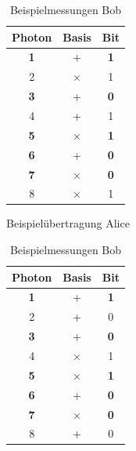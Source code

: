 \begin{table}[ht]
    \centering
    \setlength\tabcolsep{4pt}
    \begin{minipage}{.45\textwidth}
        \centering
        \begin{tabular}{|c|c|c|}
        \hline
        Photon      & Basis     & Bit           \\ \hline
        \textbf{1}  & +         & \textbf{1}    \\ \hline
        2           & $\times$  & 1             \\ \hline 
        \textbf{3}  & +         & \textbf{0}    \\ \hline
        4           & +         & 1             \\ \hline
        \textbf{5}  & $\times$  & \textbf{1}    \\ \hline
        \textbf{6}  & +         & \textbf{0}    \\ \hline
        \textbf{7}  & $\times$  & \textbf{0}    \\ \hline
        8           & $\times$  & 1             \\ \hline
        \end{tabular}
        \caption{Beispielübertragung Alice}
    \end{minipage}%
    \hfill
    \begin{minipage}{.45\textwidth}
        \centering
        \begin{tabular}{|c|c|c|}
        \hline
        Photon      & Basis     & Bit           \\ \hline
        \textbf{1}  & +         & \textbf{1}    \\ \hline
        2           & +         & 0             \\ \hline 
        \textbf{3}  & +         & \textbf{0}    \\ \hline
        4           & $\times$  & 1             \\ \hline
        \textbf{5}  & $\times$  & \textbf{1}    \\ \hline
        \textbf{6}  & +         & \textbf{0}    \\ \hline
        \textbf{7}  & $\times$  & \textbf{0}    \\ \hline
        8           & +         & 0             \\ \hline
        \end{tabular}
        \caption{Beispielmessungen Bob}
    \end{minipage}
\end{table}

